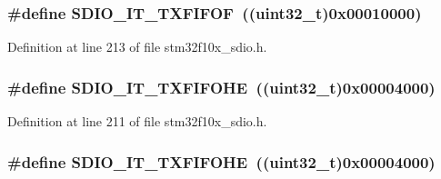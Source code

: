 \subsubsection[{\texorpdfstring{S\+D\+I\+O\+\_\+\+I\+T\+\_\+\+T\+X\+F\+I\+F\+OF}{SDIO_IT_TXFIFOF}}]{\setlength{\rightskip}{0pt plus 5cm}\#define S\+D\+I\+O\+\_\+\+I\+T\+\_\+\+T\+X\+F\+I\+F\+OF~(({\bf uint32\+\_\+t})0x00010000)}\hypertarget{group___s_d_i_o___interrupt__sources_ga3ec471bd9233561d6e929ebac6362b75}{}\label{group___s_d_i_o___interrupt__sources_ga3ec471bd9233561d6e929ebac6362b75}


Definition at line 213 of file stm32f10x\+\_\+sdio.\+h.

\subsubsection[{\texorpdfstring{S\+D\+I\+O\+\_\+\+I\+T\+\_\+\+T\+X\+F\+I\+F\+O\+HE}{SDIO_IT_TXFIFOHE}}]{\setlength{\rightskip}{0pt plus 5cm}\#define S\+D\+I\+O\+\_\+\+I\+T\+\_\+\+T\+X\+F\+I\+F\+O\+HE~(({\bf uint32\+\_\+t})0x00004000)}\hypertarget{group___s_d_i_o___interrupt__sources_gaf538ae7dd73d55e76069e8710858038a}{}\label{group___s_d_i_o___interrupt__sources_gaf538ae7dd73d55e76069e8710858038a}


Definition at line 211 of file stm32f10x\+\_\+sdio.\+h.

\subsubsection[{\texorpdfstring{S\+D\+I\+O\+\_\+\+I\+T\+\_\+\+T\+X\+F\+I\+F\+O\+HE}{SDIO_IT_TXFIFOHE}}]{\setlength{\rightskip}{0pt plus 5cm}\#define S\+D\+I\+O\+\_\+\+I\+T\+\_\+\+T\+X\+F\+I\+F\+O\+HE~(({\bf uint32\+\_\+t})0x00004000)}\hypertarget{group___s_d_i_o___interrupt__sources_gaf538ae7dd73d55e76069e8710858038a}{}\label{group___s_d_i_o___interrupt__sources_gaf538ae7dd73d55e76069e8710858038a}


